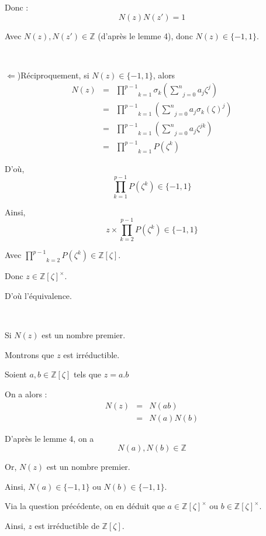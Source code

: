 Donc :
\[ N (z) N (z') = 1 \]


Avec $N (z), N (z') \in \mathbb{Z}$ (d'apr{\`e}s le lemme 4), donc $N (z) \in
\{ - 1, 1 \}$.

\

$\Leftarrow$)R{\'e}ciproquement, si $N (z) \in \{ - 1, 1 \}$, alors
\begin{eqnarray*}
  N (z) & = & \underset{k = 1}{\overset{p - 1}{\prod}} \sigma_k \left(
  \underset{j = 0}{\overset{n}{\sum}} a_j \zeta^j \right)\\
  & = & \underset{k = 1}{\overset{p - 1}{\prod}} \left( \underset{j =
  0}{\overset{n}{\sum}} a_j \sigma_k (\zeta)^j \right)\\
  & = & \underset{k = 1}{\overset{p - 1}{\prod}} \left( \underset{j =
  0}{\overset{n}{\sum}} a_j \zeta^{j k} \right)\\
  & = & \underset{k = 1}{\overset{p - 1}{\prod}} P (\zeta^k)
\end{eqnarray*}


D'o{\`u},
\[ \underset{k = 1}{\overset{p - 1}{\prod}} P (\zeta^k) \in \{ - 1, 1 \} \]


Ainsi,
\[ z \times \underset{k = 2}{\overset{p - 1}{\prod}} P (\zeta^k) \in \{ - 1, 1
   \} \]


Avec $\underset{k = 2}{\overset{p - 1}{\prod}} P (\zeta^k) \in \mathbb{Z}
[\zeta]$.

Donc $z \in \mathbb{Z} [\zeta]^{\times}$.

D'o{\`u} l'{\'e}quivalence.

\

 Si $N (z)$ est un nombre premier.

Montrons que $z$ est irr{\'e}ductible.

Soient $a, b \in \mathbb{Z} [\zeta]$ tels que $z = a.b$

On a alors :
\begin{eqnarray*}
  N (z) & = & N (a b)\\
  & = & N (a) N (b)
\end{eqnarray*}


D'apr{\`e}s le lemme 4, on a
\[ N (a), N (b) \in \mathbb{Z} \]


Or, $N (z)$ est un nombre premier.

Ainsi, $N (a) \in \{ - 1, 1 \}$ ou $N (b) \in \{ - 1, 1 \}$.

Via la question pr{\'e}c{\'e}dente, on en d{\'e}duit que $a \in \mathbb{Z}
[\zeta]^{\times}$ ou $b \in \mathbb{Z} [\zeta]^{\times}$.

Ainsi, $z$ est irr{\'e}ductible de $\mathbb{Z} [\zeta]$.

